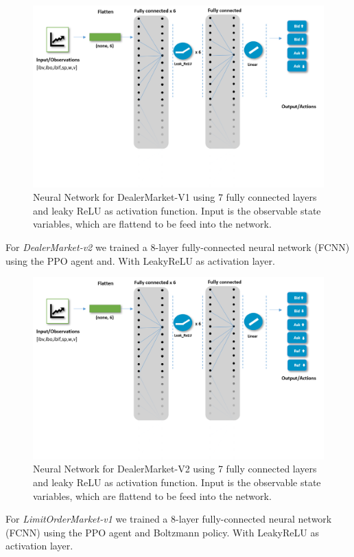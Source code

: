 \documentclass{kththesis}
\theoremstyle{definition}
\begin{document}
\begin{figure}[H]
    \centering
    \includegraphics[scale=.5]{Imgs/nnadmv1.png}
    \caption{Neural Network for DealerMarket-V1 using 7 fully connected layers and leaky ReLU as activation function. Input is the observable state variables, which are flattend to be feed into the network.}
    \label{fig:e1}
\end{figure}
For \textit{DealerMarket-v2} we trained a 8-layer fully-connected neural network (FCNN) using the PPO agent and. With LeakyReLU as activation layer.

\begin{figure}[H]
    \centering
    \includegraphics[scale=.5]{Imgs/nna1.png}
    \caption{Neural Network for DealerMarket-V2 using 7 fully connected layers and leaky ReLU as activation function. Input is the observable state variables, which are flattend to be feed into the network.}
    \label{fig:e2}
\end{figure}
For \textit{LimitOrderMarket-v1} we trained a 8-layer fully-connected neural network (FCNN) using the PPO agent and Boltzmann policy. With LeakyReLU as activation layer.
\end{document}
